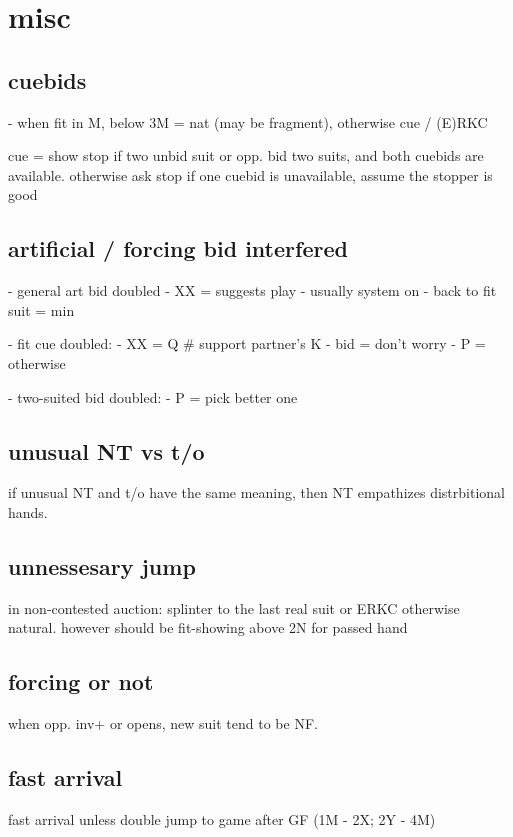 \section{misc}

\subsection{cuebids}

- when fit in M, below 3M = nat (may be fragment), otherwise cue / (E)RKC

cue = show stop if two unbid suit or opp. bid two suits, and both cuebids are available.
    otherwise ask stop
    if one cuebid is unavailable, assume the stopper is good

\subsection{artificial / forcing bid interfered}

- general art bid doubled
    - XX = suggests play
    - usually system on 
    - back to fit suit = min

- fit cue doubled:
    - XX = Q  \# support partner's K
    - bid = don't worry
    - P = otherwise

- two-suited bid doubled:
    - P = pick better one


\subsection{unusual NT vs t/o}

if unusual NT and t/o have the same meaning, then NT empathizes distrbitional hands.


\subsection{unnessesary jump}

in non-contested auction: splinter to the last real suit or ERKC
otherwise natural. however should be fit-showing above 2N for passed hand

\subsection{forcing or not}

when opp. inv+ or opens, new suit tend to be NF.

\subsection{fast arrival}

fast arrival unless double jump to game after GF (1M - 2X; 2Y - 4M)

